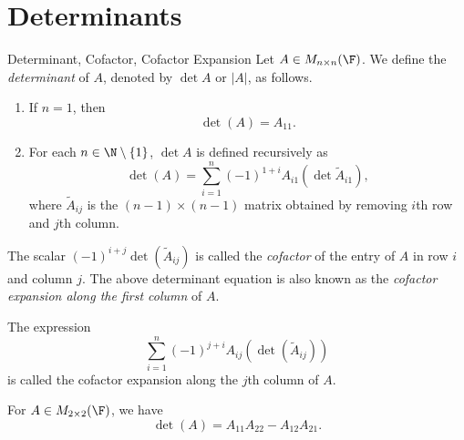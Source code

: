 \documentclass[linearalgebraI]{subfiles}
\begin{document}

    \section{Determinants}

    \begin{definition}{Determinant, Cofactor, Cofactor Expansion}{}
        Let $A\in M_{n\times n}(\F)$. We define the \emph{determinant} of $A$, denoted by $\det A$ or $|A|$, as follows.
        \begin{enumerate}
            \item If $n=1$, then
            \begin{equation*}
                \det(A) = A_{11}.
            \end{equation*}
            \item For each $n\in \N\setminus \left\lbrace 1 \right\rbrace$, $\det A$ is defined recursively as
            \begin{equation*}
                \det(A) = \sum^{n}_{i=1} (-1)^{1+i} A_{i1} \left( \det \widetilde{A}_{i1} \right), 
            \end{equation*}
            where $\widetilde{A}_{ij}$ is the $(n-1)\times (n-1)$ matrix obtained by removing $i$th row and $j$th column.
        \end{enumerate}
        The scalar $(-1)^{i+j} \det \left(\widetilde{A}_{ij}\right)$ is called the \emph{cofactor} of the entry of $A$ in row $i$ and column $j$. The above determinant equation is also known as the \emph{cofactor expansion along the first column} of $A$.
    \end{definition}

    \begin{remark}
        The expression
        \begin{equation*}
            \sum^n_{i=1} (-1)^{j+i}A_{ij} \left( \det \left(\widetilde{A}_{ij}\right) \right)
        \end{equation*}
        is called the cofactor expansion along the $j$th column of $A$.
    \end{remark}

    \begin{remark}
        For $A\in M_{2\times 2}(\F)$, we have
        \begin{equation*}
            \det (A) = A_{11}A_{22} - A_{12}A_{21}.
        \end{equation*}
    \end{remark}
\end{document}
